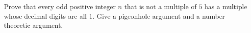 Prove that every odd positive integer $n$ that is not a multiple of $5$ has a multiple whose decimal digits are all $1$. Give a pigeonhole argument and a number-theoretic argument.
